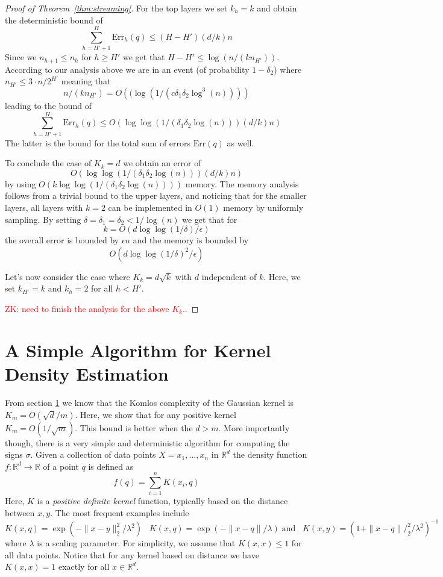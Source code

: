 \documentclass[anon,12pt]{colt2019} %
\newcommand{\zk}[1]{\textcolor{red}{ZK: #1}}
\newcommand{\R}{\mathbb{R}}
\newcommand{\eps}{\epsilon}
\begin{document}
\begin{proof} [Proof of Theorem~\ref{thm:streaming}]
For the top layers we set $k_h=k$ and obtain the deterministic bound of 
$$ \sum_{h=H'+1}^H \text{Err}_h(q) \leq (H-H')(d/k)n $$
Since we $n_{h+1} \leq n_h$ for $h \geq H'$ we get that $H-H' \leq \log(n/(kn_{H'}))$. According to our analysis above we are in an event (of probability $1-\delta_2$) where $n_{H'} \leq 3 \cdot n/2^{H'}  $ meaning that
$$ n/(kn_{H'}) = O\left((\log\left(1/\left(c \delta_1 \delta_2 \log^3(n)\right)\right)\right) $$
leading to the bound of 
$$ \sum_{h=H'+1}^H \text{Err}_h(q) \leq O\left( \log \log\left( 1/\left( \delta_1\delta_2\log(n) \right)\right)(d/k)n \right)$$
The latter is the bound for the total sum of errors $\text{Err}(q)$ as well.

To conclude the case of $K_k=d$ we obtain an error of 
$$O\left( \log \log\left( 1/\left( \delta_1\delta_2\log(n) \right)\right)(d/k)n \right)$$
by using $O(k\log \log\left( 1/\left( \delta_1\delta_2\log(n) \right)\right))$ memory. The memory analysis follows from a trivial bound to the upper layers, and noticing that for the smaller layers, all layers with $k=2$ can be implemented in $O(1)$ memory by uniformly sampling. By setting $\delta=\delta_1=\delta_2 < 1/\log(n)$ we get that for 
$$ k=O(d\log\log(1/\delta)/\eps) $$
the overall error is bounded by $\eps n$ and the memory is bounded by 
$$ O(d\log\log(1/\delta)^2/\eps) $$

Let's now consider the case where $K_k = d\sqrt{k}$ with $d$ independent of $k$. Here, we set $k_{H'}=k$ and $k_h=2$ for all $h<H'$.

\zk{need to finish the analysis for the above $K_k$..}
\end{proof}


\section{A Simple Algorithm for Kernel Density Estimation}

From section \ref{} we know that the Komlos complexity of the Gaussian kernel is $K_m = O(\sqrt{d}/m)$. Here, we show that for any positive kernel $K_m = O(1/\sqrt{m})$. This bound is better when the $d > m$. More importantly though, there is a very simple and deterministic algorithm for computing the signs $\sigma$. 
Given a collection of data points $X = x_1,\ldots, x_n$ in $\R^d$ the density function $f: \R^d \rightarrow \R$ of a point $q$ is defined as 
$$ f(q) = \sum_{i=1}^{n} K(x_i,q) $$
Here, $K$ is a \emph{positive definite kernel} function, typically based on the distance between $x,y$. The most frequent examples include
$$ K(x,q) = \exp(- \|x-y\|_2^2/\lambda^2)\;\;\; K(x,q) = \exp(- \|x-q\|/\lambda) \; \mbox{and}\;\;\; K(x,y) = (1+\|x-q\|/_2^2/\lambda^2)^{-1}$$
where $\lambda$ is a scaling parameter. For simplicity, we assume that $K(x,x) \leq 1$ for all data points. Notice that for any kernel based on distance we have $K(x,x)=1$ exactly for all $x \in \R^d$.
\end{document}
